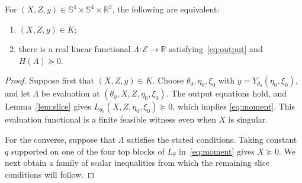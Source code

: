 \begin{samepage}
\begin{proposition}\label{prop:lift}
For $(X,Z,y)\in\mathbb S^4\times\mathbb S^4\times\mathbb R^3$, the
following are equivalent:
\begin{enumerate}
  \item $(X,Z,y)\in K$;
  \item there is a real linear functional $\Lambda:\mathcal E\to\mathbb R$
  satisfying~\eqref{eq:output} and $H(\Lambda)\succeq0$.
\end{enumerate}
\end{proposition}
\end{samepage}

\begin{proof}
Suppose first that $(X,Z,y)\in K$.  Choose
$\theta_0,\eta_0,\xi_0$ with
$y=Y_{\theta_0}(\eta_0,\xi_0)$, and let $\Lambda$ be evaluation at
$(\theta_0,X,Z,\eta_0,\xi_0)$.  The output equations hold, and
Lemma~\ref{lem:slice} gives
$L_{\theta_0}(X,Z,\eta_0,\xi_0)\succeq0$, which implies
\eqref{eq:moment}.  This evaluation functional is a finite feasible
witness even when $X$ is singular.

For the converse, suppose that $\Lambda$ satisfies the stated conditions.
Taking constant $q$ supported on one of the four top blocks of $L_\theta$
in~\eqref{eq:moment} gives $X\succeq0$.
We next obtain a family of scalar inequalities from which the remaining
slice conditions will follow.


\end{proof}
